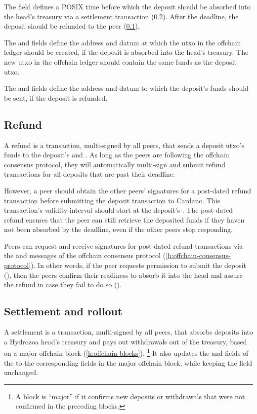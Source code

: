 \documentclass[../hydrozoa.tex]{subfiles}
\begin{document}
The  field defines a POSIX time before which the deposit should be absorbed into the head's treasury via a settlement transaction (\cref{h:multisig-settle}).
After the deadline, the deposit should be refunded to the peer (\cref{h:multisig-refund}).

The  and  fields define the address and datum at which the utxo in the offchain ledger should be created, if the deposit is absorbed into the head's treasury.
The new utxo in the offchain ledger should contain the same funds as the deposit utxo.

The  and  fields define the address and datum to which the deposit's funds should be sent, if the deposit is refunded.

\subsection{Refund}%
\label{h:multisig-refund}
A refund is a transaction, multi-signed by all peers, that sends a deposit utxo's funds to the deposit's  and .
As long as the peers are following the offchain consensus protocol, they will automatically multi-sign and submit refund transactions for all deposits that are past their deadline.

However, a peer should obtain the other peers' signatures for a post-dated refund transaction before submitting the deposit transaction to Cardano.
This transaction's validity interval should start at the deposit's .
The post-dated refund ensures that the peer can still retrieve the deposited funds if they haven not been absorbed by the deadline, even if the other peers stop responding.

Peers can request and receive signatures for post-dated refund transactions via the  and  messages of the offchain consensus protocol (\cref{h:offchain-consensus-protocol}).
In other words, if the peer requests permission to submit the deposit (), then the peers confirm their readiness to absorb it into the head and assure the refund in case they fail to do so ().

\subsection{Settlement and rollout}%
\label{h:multisig-settle}
A settlement is a transaction, multi-signed by all peers, that absorbs deposits into a Hydrozoa head's treasury and pays out withdrawals out of the treasury, based on a major offchain block (\cref{h:offchain-blocks}).%
\footnote{A block is ``major'' if it confirms new deposits or withdrawals that were not confirmed in the preceding blocks.}
It also updates the  and  fields of the  to the corresponding fields in the major offchain block, while keeping the  field unchanged.
\end{document}
